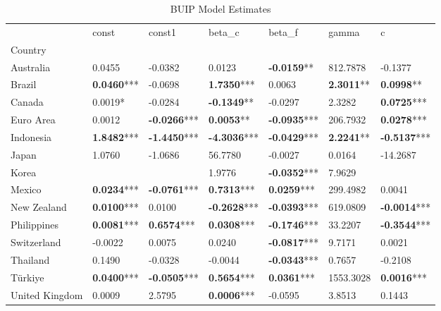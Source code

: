 \begin{table}
\caption{BUIP Model Estimates}
\label{tab:buip_results}
\begin{tabular}{lllllll}
\toprule
 & const & const1 & beta_c & beta_f & gamma & c \\
Country &  &  &  &  &  &  \\
\midrule
Australia & 0.0455 & -0.0382 & 0.0123 & \textbf{-0.0159}** & 812.7878 & -0.1377 \\
Brazil & \textbf{0.0460}*** & -0.0698 & \textbf{1.7350}*** & 0.0063 & \textbf{2.3011}** & \textbf{0.0998}** \\
Canada & 0.0019* & -0.0284 & \textbf{-0.1349}** & -0.0297 & 2.3282 & \textbf{0.0725}*** \\
Euro Area & 0.0012 & \textbf{-0.0266}*** & \textbf{0.0053}** & \textbf{-0.0935}*** & 206.7932 & \textbf{0.0278}*** \\
Indonesia & \textbf{1.8482}*** & \textbf{-1.4450}*** & \textbf{-4.3036}*** & \textbf{-0.0429}*** & \textbf{2.2241}** & \textbf{-0.5137}*** \\
Japan & 1.0760 & -1.0686 & 56.7780 & -0.0027 & 0.0164 & -14.2687 \\
Korea &  &  & 1.9776 & \textbf{-0.0352}*** & 7.9629 &  \\
Mexico & \textbf{0.0234}*** & \textbf{-0.0761}*** & \textbf{0.7313}*** & \textbf{0.0259}*** & 299.4982 & 0.0041 \\
New Zealand & \textbf{0.0100}*** & 0.0100 & \textbf{-0.2628}*** & \textbf{-0.0393}*** & 619.0809 & \textbf{-0.0014}*** \\
Philippines & \textbf{0.0081}*** & \textbf{0.6574}*** & \textbf{0.0308}*** & \textbf{-0.1746}*** & 33.2207 & \textbf{-0.3544}*** \\
Switzerland & -0.0022 & 0.0075 & 0.0240 & \textbf{-0.0817}*** & 9.7171 & 0.0021 \\
Thailand & 0.1490 & -0.0328 & -0.0044 & \textbf{-0.0343}*** & 0.7657 & -0.2108 \\
Türkiye & \textbf{0.0400}*** & \textbf{-0.0505}*** & \textbf{0.5654}*** & \textbf{0.0361}*** & 1553.3028 & \textbf{0.0016}*** \\
United Kingdom & 0.0009 & 2.5795 & \textbf{0.0006}*** & -0.0595 & 3.8513 & 0.1443 \\
\bottomrule
\end{tabular}
\end{table}
